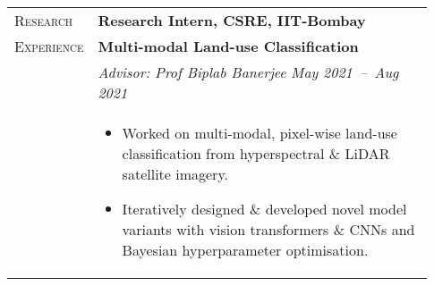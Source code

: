 \documentclass[letterpaper, 10pt, oneside]{article}
\newcommand{\stitle}[1]{\normalsize{\textsc{#1}}}
\newcommand{\bdit}[1]{{\textbf{#1}}}
\begin{document}
\begin{longtable}{@{} p{0.13\linewidth} p{0.8\linewidth}}
    \stitle{Research}    & \bdit{Research Intern, CSRE, IIT-Bombay}                                                                                                                                                                          \\
    \stitle{Experience}  & \bdit{Multi-modal Land-use Classification}                                                                                                                                                                        \\
                         & \textsl{Advisor: Prof Biplab Banerjee} \hfill \textsl{May 2021\ --\ Aug 2021}                                                                                                                                     \\
                         & \parbox{0.8\textwidth}{                                                                                                                                                                                           %
        \begin{itemize}[leftmargin=*, itemsep=-0.88ex, topsep=-0.88ex]
            \item Worked on multi-modal, pixel-wise land-use classification from hyperspectral \& LiDAR satellite imagery.
            \item Iteratively designed \& developed novel model variants with vision transformers \& CNNs and Bayesian hyperparameter optimisation.
        \end{itemize}
    }
    \\
    \\


\end{longtable}
\end{document}
